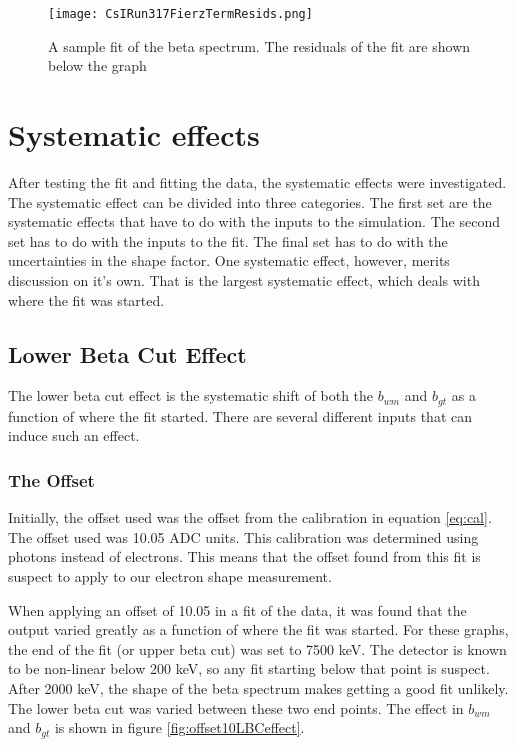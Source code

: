 \documentclass[../MaxHughesThesis.tex]{subfiles}
\begin{document}
\begin{figure}[!htb]
	\centerline{\texttt{[image: CsIRun317FierzTermResids.png]}}
	\caption{A sample fit of the beta spectrum. 
		 The residuals of the fit are shown below the graph}
	\label{fig:samplefit}
\end{figure}

\section{Systematic effects}

After testing the fit and fitting the data, the systematic effects were investigated.
The systematic effect can be divided into three categories.
The first set are the systematic effects that have to do with the inputs to the simulation.
The second set has to do with the inputs to the fit.
The final set has to do with the uncertainties in the shape factor. 
One systematic effect, however, merits discussion on it's own.
That is the largest systematic effect, which deals with where the fit was started.

\subsection{Lower Beta Cut Effect}

The lower beta cut effect is the systematic shift of both the $b_{wm}$ and $b_{gt}$ as a function of where the fit started.
There are several different inputs that can induce such an effect.

\subsubsection{The Offset}
Initially, the offset used was the offset from the calibration  in equation \ref{eq:cal}.
The offset used was 10.05 ADC units.
This calibration was determined using photons instead of electrons.
This means that the offset found from this fit is suspect to apply to our electron shape measurement.

When applying an offset of 10.05 in a fit of the data, it was found that the output varied greatly as a function of where the fit was started.
For these graphs, the end of the fit (or upper beta cut) was set to 7500 keV.
The detector is known to be non-linear below 200 keV, so any fit starting below that point is suspect. 
After 2000 keV, the shape of the beta spectrum makes getting a good fit unlikely.
The lower beta cut was varied between these two end points.
The effect in $b_{wm}$ and $b_{gt}$ is shown in figure \ref{fig:offset10LBCeffect}.
\end{document}
